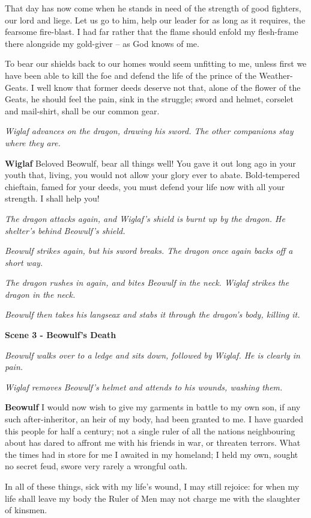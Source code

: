 \documentclass[a4paper]{article}
\begin{document}
{That day has now come
when he stands in need of the strength of good fighters,
our lord and liege. Let us go to him,
help our leader for as long as it requires,
the fearsome fire-blast. I had far rather
that the flame should enfold my flesh-frame there
alongside my gold-giver – as God knows of me.

To bear our shields back to our homes
would seem unfitting to me, unless first we have been able
to kill the foe and defend the life
of the prince of the Weather-Geats. I well know
that former deeds deserve not that, alone
of the flower of the Geats, he should feel the pain,
sink in the struggle; sword and helmet,
corselet and mail-shirt, shall be our common gear.

\centerline{\textit{Wiglaf advances on the dragon, drawing his sword. The other companions stay where they are.}}

\textbf{Wiglaf} Beloved Beowulf, bear all things well!
You gave it out long ago in your youth
that, living, you would not allow your glory
ever to abate. Bold-tempered chieftain,
famed for your deeds, you must defend your life now
with all your strength. I shall help you!

\centerline{\textit{The dragon attacks again, and Wiglaf's shield is burnt up by the dragon. He shelter's behind Beowulf's shield.}}
\centerline{\textit{Beowulf strikes again, but his sword breaks. The dragon once again backs off a short way.}}

\centerline{\textit{The dragon rushes in again, and bites Beowulf in the neck. Wiglaf strikes the dragon in the neck.}}
\centerline{\textit{Beowulf then takes his langseax and stabs it through the dragon's body, killing it.}}

\centerline{\textbf{Scene 3 - Beowulf's Death}}
\centerline{\textit{Beowulf walks over to a ledge and sits down, followed by Wiglaf. He is clearly in pain.}}
\centerline{\textit{Wiglaf removes Beowulf's helmet and attends to his wounds, washing them.}}

\textbf{Beowulf} I would now wish to give my garments in battle
to my own son, if any such
after-inheritor, an heir of my body,
had been granted to me. I have guarded this people
for half a century; not a single ruler
of all the nations neighbouring about
has dared to affront me with his friends in war,
or threaten terrors. What the times had in store for me
I awaited in my homeland; I held my own,
sought no secret feud, swore very rarely
a wrongful oath.

In all of these things,
sick with my life’s wound, I may still rejoice:
for when my life shall leave my body
the Ruler of Men may not charge me
with the slaughter of kinsmen.

}
\end{document}
